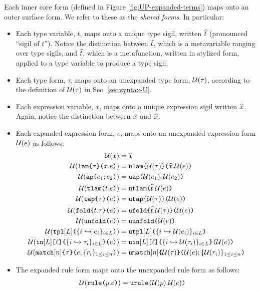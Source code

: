 {{{{Each inner core form (defined in Figure \ref{fig:UP-expanded-terms}) maps onto an outer surface form. We refer to these as the \emph{shared forms}. In particular:
\begin{itemize}
\item Each type variable, $t$, maps onto a unique {type sigil}, written $\widehat{t}$ (pronounced ``sigil of $t$''). Notice the distinction between ${\hat{t}}$, which is a metavariable ranging over type sigils, and $\widehat{t}$, which is a metafunction, written in stylized form, applied to a type variable to produce a type sigil.
\item Each type form, $\tau$, maps onto an unexpanded type form, $\mathcal{U}(\tau)$, according to the definition of $\mathcal{U}(\tau)$ in Sec. \ref{sec:syntax-U}.
\item Each expression variable, $x$, maps onto a unique expression sigil written $\widehat{x}$. Again, notice the distinction between ${\hat x}$ and $\widehat{x}$.
\item Each expanded expression form, $e$, maps onto an unexpanded expression form $\mathcal{U}(e)$ as follows:
\begin{align*}
\mathcal{U}(x) & = \widehat{x}\\
\mathcal{U}(\texttt{lam}\texttt{\{}\tau\texttt{\}(}x.e\texttt{)}) & = \texttt{ulam}\texttt{\{}\mathcal{U}(\tau)\texttt{\}(}\widehat{x}.\mathcal{U}(e)\texttt{)}\\
\mathcal{U}(\texttt{ap}\texttt{(}e_1; e_2\texttt{)}) & = \texttt{uap}\texttt{(}\mathcal{U}(e_1); \mathcal{U}(e_2)\texttt{)}\\
\mathcal{U}(\texttt{tlam}\texttt{(}t.e\texttt{)}) & = \texttt{utlam}\texttt{(}\widehat{t}.\mathcal{U}(e)\texttt{)}\\
\mathcal{U}(\texttt{tap}\texttt{\{}\tau\texttt{\}(}e\texttt{)}) & = \texttt{utap}\texttt{\{}\mathcal{U}(\tau)\texttt{\}(}\mathcal{U}(e)\texttt{)}\\
\mathcal{U}(\texttt{fold}\texttt{\{}t.\tau\texttt{\}(}e\texttt{)}) & = \texttt{ufold}\texttt{\{}\widehat{t}.\mathcal{U}(\tau)\texttt{\}(}\mathcal{U}(e)\texttt{)}\\
\mathcal{U}(\texttt{unfold}\texttt{(}e\texttt{)}) & = \texttt{uunfold}\texttt{(}\mathcal{U}(e)\texttt{)}\\
\mathcal{U}(\texttt{tpl}[L]\texttt{(}\{i \hookrightarrow e_{i}\}_{i \in L}\texttt{)}) & = \texttt{utpl}[L]\texttt{(}\{i \hookrightarrow \mathcal{U}(e_{i})\}_{i \in L}\texttt{)}\\
\mathcal{U}(\texttt{in}[L]\texttt{[}\ell\texttt{]\{}\{i \hookrightarrow \tau_{i}\}_{i \in L}\texttt{\}(}e\texttt{)}) &= \texttt{uin}[L]\texttt{[}\ell\texttt{]\{}\{i \hookrightarrow \mathcal{U}(\tau_{i})\}_{i \in L}\texttt{\}(}\mathcal{U}(e)\texttt{)}\\
\mathcal{U}(\texttt{match}[n]\texttt{\{}\tau\texttt{\}(}e; \{r_{i}\}_{1 \leq i \leq n}\texttt{)}) &= \texttt{umatch}[n]\texttt{\{}\mathcal{U}(\tau)\texttt{\}(}\mathcal{U}(e); \{\mathcal{U}(r_i)\}_{1 \leq i \leq n}\texttt{)}\\
\end{align*}
\item The expanded rule form maps onto the unexpanded rule form as follows:
\begin{align*}
\Uof{\aematchrule{p}{e}} & = \aumatchrule{\Uof{p}}{\Uof{e}}

\end{align*}
\end{itemize}}}}}
